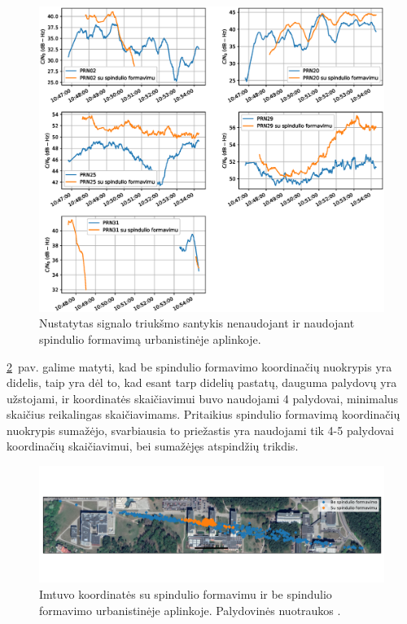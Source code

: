 \documentclass[main.tex]{subfiles}
\begin{document}
\begin{figure}[ht]
    \begin{centering}
    \includegraphics[scale=0.6]{drawings/two_reflections_snr}
    \par\end{centering}
    \protect\caption{\label{fig:two_reflection_snr}Nustatytas signalo triukšmo santykis nenaudojant ir naudojant spindulio formavimą urbanistinėje aplinkoje.}
\end{figure}

\ref{fig:two_reflection_map}~pav. galime matyti, kad be spindulio formavimo koordinačių
nuokrypis yra didelis, taip yra dėl to, kad esant tarp didelių pastatų, dauguma palydovų
yra užstojami, ir koordinatės skaičiavimui buvo naudojami 4 palydovai, minimalus
skaičius reikalingas skaičiavimams. Pritaikius spindulio formavimą koordinačių
nuokrypis sumažėjo, svarbiausia to priežastis yra naudojami tik 4-5 palydovai koordinačių
skaičiavimui, bei sumažėjęs atspindžių trikdis.

\begin{figure}[ht]
    \begin{centering}
    \includegraphics[scale=0.5]{drawings/two_reflections_map}
    \par\end{centering}
    \protect\caption{\label{fig:two_reflection_map}Imtuvo koordinatės su spindulio formavimu ir be spindulio formavimo urbanistinėje aplinkoje. Palydovinės nuotraukos \cite{google_maps}.}
\end{figure}
\end{document}
